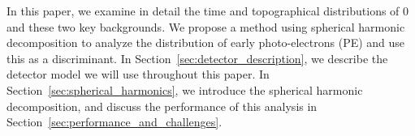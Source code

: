 In this paper, we examine in detail the time and topographical distributions of 0\nbb~ and these two key backgrounds. We propose a method using spherical harmonic decomposition to analyze the distribution of early photo-electrons (PE) and use this as a discriminant. In Section~\ref{sec:detector_description}, we describe the detector model we will use throughout this paper. In Section~\ref{sec:spherical_harmonics}, we introduce the spherical harmonic decomposition, and discuss the performance of this analysis in Section~\ref{sec:performance_and_challenges}.



  
